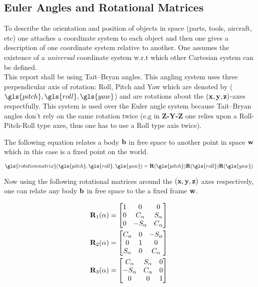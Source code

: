  \tocless\subsection{Euler Angles and Rotational Matrices}

To describe the orientation and position of objects in space (parts, tools, aircraft, etc) one attaches a coordinate system to each object and then one gives a description of one coordinate system relative to another. One assumes the existence of a \textit{universal} coordinate system w.r.t which other Cartesian system can be defined. \\

This report shall be using Tait–Bryan angles.  This angling system uses three perpendicular axis of rotation: Roll, Pitch and Yaw which are denoted by ($\gls{pitch},\gls{roll},\gls{yaw}$)  and are rotations about the $(\bf x,y,z)$-axes respectfully. This system is used over the Euler angle system because Tait–Bryan angles don't rely on the same rotation twice (e.g in {\bf Z-Y-Z} one relies upon a Roll-Pitch-Roll type axes, thus one has to use a Roll type axis twice).

The following equation relates a body $\bf b$ in free space to another point in space $\bf w$ which in this case is a fixed point on the world.

\begin{equation}
\gls{rotationmatrix}(\gls{pitch},\gls{roll},\gls{yaw}) = {\bf R}(\gls{pitch}){\bf R}(\gls{roll}){\bf R}(\gls{yaw})
\label{eq: rotation matrix}
\end{equation}

Now using the following rotational matrices around the $(\bf x,y,z)$ axes respectively, one can relate any body $\bf b$ in free space to the a fixed frame $\bf w$.

 \begin{align}
{\bf R}_1(\alpha) &=  \begin{bmatrix}
1& 0 & 0           \\
0 & C_{\alpha}         & S_{\alpha}   \\
0           & -S_{\alpha}  & C_{\alpha}  
\end{bmatrix}\\
{\bf R}_2(\alpha) &=  \begin{bmatrix}
C_{\alpha}& 0 & -S_{\alpha}         \\
0 & 1       & 0   \\
S_{\alpha}   & 0 & C_{\alpha}  
\end{bmatrix}\\
{\bf R}_3(\alpha) &=  \begin{bmatrix}
C_{\alpha}&  S_{\alpha}   & 0       \\
- S_{\alpha}   & C_{\alpha}  & 0 \\
0   & 0 & 1 
\end{bmatrix}
\label{eq: rotation matrix in z direction}
 \end{align}

